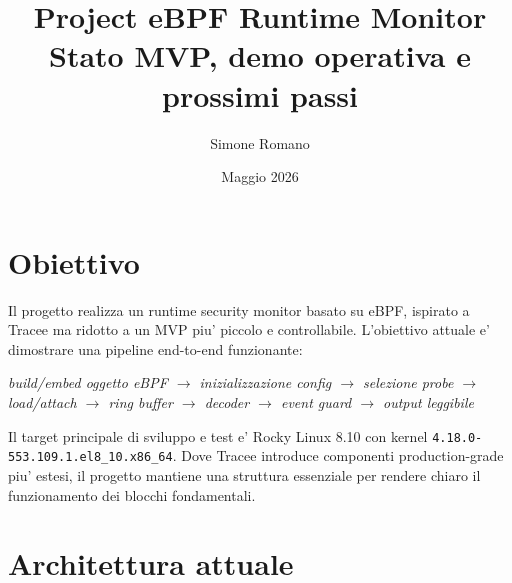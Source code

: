 \documentclass[11pt,a4paper]{article}
\title{\textbf{Project eBPF Runtime Monitor}\\
\large Stato MVP, demo operativa e prossimi passi}
\author{Simone Romano}
\date{Maggio 2026}
\begin{document}
\maketitle

\section{Obiettivo}

Il progetto realizza un runtime security monitor basato su eBPF, ispirato a
Tracee ma ridotto a un MVP piu' piccolo e controllabile. L'obiettivo attuale e'
dimostrare una pipeline end-to-end funzionante:

\begin{center}
\textit{build/embed oggetto eBPF $\rightarrow$ inizializzazione config
$\rightarrow$ selezione probe $\rightarrow$ load/attach $\rightarrow$ ring buffer
$\rightarrow$ decoder $\rightarrow$ event guard $\rightarrow$ output leggibile}
\end{center}

Il target principale di sviluppo e test e' Rocky Linux 8.10 con kernel
\texttt{4.18.0-553.109.1.el8\_10.x86\_64}. Dove Tracee introduce componenti
production-grade piu' estesi, il progetto mantiene una struttura essenziale per
rendere chiaro il funzionamento dei blocchi fondamentali.

\section{Architettura attuale}
\end{document}
